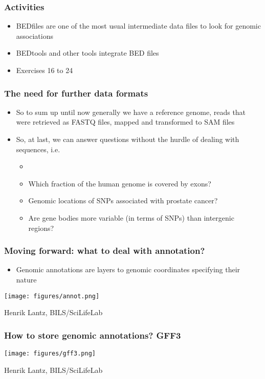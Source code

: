 \documentclass{beamer}
\begin{document}
\begin{frame}
  \frametitle{Activities}
  \begin{itemize}
  \item BEDfiles are one of the most usual intermediate data files to look for genomic associations
  \item BEDtools and other tools integrate BED files
  \item Exercises 16 to 24
  \end{itemize}
\end{frame}


\begin{frame}
  \frametitle{The need for further data formats}
  \begin{itemize}
  \item So to sum up until now generally we have a reference genome, reads that were retrieved as FASTQ files, mapped and transformed to SAM files 
  \item So, at last, we can answer questions without the hurdle of dealing with sequences, i.e.
    \begin{itemize}
    \item \item Which fraction of the human genome is covered by exons? 
    \item Genomic locations of SNPs associated with prostate cancer?
    \item Are gene bodies more variable (in terms of SNPs) than intergenic regions?
    \end{itemize}
  \end{itemize}
\end{frame}



\begin{frame}
  \frametitle{Moving forward: what to deal with annotation?}
  \begin{itemize}
  \item Genomic annotations are layers to genomic coordinates specifying their nature
  \end{itemize}
\centering
\texttt{[image: figures/annot.png]}

Henrik Lantz, BILS/SciLifeLab
\end{frame}


\begin{frame}
  \frametitle{How to store genomic annotations? GFF3}
  
\centering
\texttt{[image: figures/gff3.png]}

Henrik Lantz, BILS/SciLifeLab
\end{frame}
\end{document}
